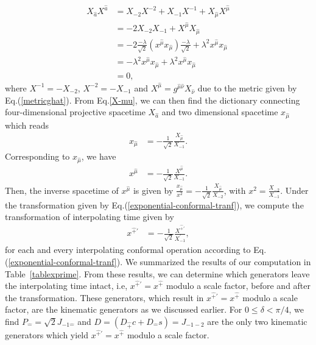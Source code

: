 \documentclass[journal,article,submit,pdftex,moreauthors]{Definitions/mdpi}
\begin{document}
\begin{align}
    {X}_{\hat{a}}{X}^{\hat{a}}&={X}_{-2}{X}^{-2}+{X}_{-1}{X}^{-1}+{X}_{\hat{\mu}}{X}^{\hat{\mu}} \nonumber \\
    &=-2{X}_{-2}{X}_{-1}+{X}^{\hat{\mu}}{X}_{\hat{\mu}}\nonumber \\
     &=-2\frac{-\lambda}{\sqrt{2}}(x^{\hat{\mu}}x_{\hat{\mu}})\frac{-\lambda}{\sqrt{2}}+\lambda^2{x}^{\hat{\mu}}{x}_{\hat{\mu}}\nonumber \\
     &=-\lambda^2{x}^{\hat{\mu}}{x}_{\hat{\mu}}+\lambda^2{x}^{\hat{\mu}}{x}_{\hat{\mu}}\nonumber \\
     &=0,
\end{align}
where ${X}^{-1}=-{X}_{-2}$, ${X}^{-2}=-{X}_{-1}$ and $X^{\hat \mu}=g^{\hat{\mu}\hat{\nu}}X_{\hat{\nu}}$ due to the metric
given by Eq.(\ref{metricghat}).
From Eq.\eqref{X-mu}, we can then find 
the dictionary connecting four-dimensional projective spacetime $X_{\hat{a}}$ and two dimensional spacetime $x_{\hat{\mu}}$ which reads
\begin{align}
    x_{\hat{\mu}}&=-\frac{1}{\sqrt{2}}\frac{{X}_{\hat{\mu}}}{ {X}_{-1}}.
\end{align}
Corresponding to $x_{\hat{\mu}}$, we have  
\begin{align}
    x^{\hat{\mu}}&=-\frac{1}{\sqrt{2}}\frac{{X}^{\hat{\mu}}}{ {X}_{-1}}.
\end{align}
Then, the inverse spacetime of $x^{\hat{\mu}}$ is given by $\frac{x_{\hat{\mu}}}{x^2}=-\frac{1}{\sqrt{2}}\frac{{X}_{\hat{\mu}}}{{X}_{-2}}$, with $x^2=\frac{{X}_{-2}}{{X}_{-1}}$. Under the transformation given by Eq.(\ref{exponential-conformal-tranf}), we compute the transformation of interpolating time given by
\begin{align}
    x^{\hat{+}\prime}&=-\frac{1}{\sqrt{2}}\frac{{X}^{\hat{+}\prime}}{ {X}^{\prime}_{-1}},
\end{align}
for each and every interpolating conformal operation according to Eq.(\ref{exponential-conformal-tranf}). We summarized the results of our computation in Table~\ref{tablexprime}.
From these results, we can determine which generators leave the interpolating time intact, i.e, $x^{\hat{+}\prime} = x^{\hat{+}}$ modulo a scale factor, before and after the transformation. These generators, which result in $x^{\hat{+}\prime}=x^{\hat{+}}$ modulo a scale factor, are the kinematic generators as we discussed earlier. For $0\leq \delta < \pi/4$, we find $P_{\hat -} = \sqrt{2}J_{-1\hat{-}}$ and $D=\left(D_{\hat{+}}c+D_{\hat{-}}s\right)=J_{-1 -2}$ are the only two kinematic generators which yield $x^{\hat{+}\prime}=x^{\hat{+}}$ modulo a scale factor.
\end{document}
